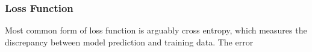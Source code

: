 \subsubsection{Loss Function}

Most common form of loss function is arguably cross entropy, which measures the discrepancy between model prediction and training data. The error 